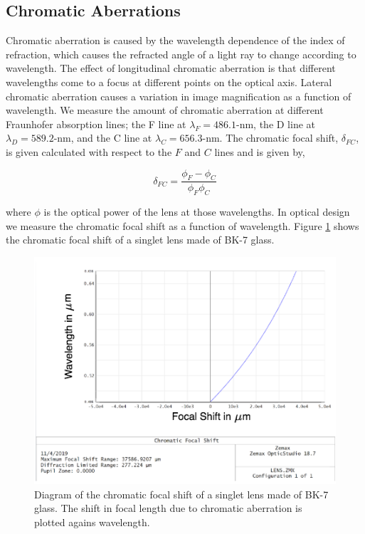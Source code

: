 \subsection{Chromatic Aberrations}

Chromatic aberration is caused by the wavelength dependence of the index of refraction, which causes the refracted angle of a light ray to change according to wavelength. The effect of longitudinal chromatic aberration is that different wavelengths come to a focus at different points on the optical axis. Lateral chromatic aberration causes a variation in image magnification as a function of wavelength. We measure the amount of chromatic aberration at different Fraunhofer absorption lines; the F line at $\lambda_F=486.1$-nm, the D line at $\lambda_D=589.2$-nm, and the C line at $\lambda_C= 656.3$-nm. The chromatic focal shift, $\delta_{FC}$,  is given calculated with respect to the $F$ and $C$ lines and is given by,

\begin{equation}
    \delta_{FC}=\frac{\phi_F-\phi_C}{\phi_F \phi_C}
\end{equation}


\noindent where $\phi$ is the optical power of the lens at those wavelengths. In optical design we measure the chromatic focal shift as a function of wavelength. Figure \ref{fig:focalshift} shows the chromatic focal shift of a singlet lens made of BK-7 glass.

\begin{figure}
    \centering
    \includegraphics[width=.7\textwidth]{Chapter Materials/Chapter Three Materials/focalshift.png}
    \caption{Diagram of the chromatic focal shift of a singlet lens made of BK-7 glass. The shift in focal length due to chromatic aberration is plotted agains wavelength.}
    \label{fig:focalshift}
\end{figure}

